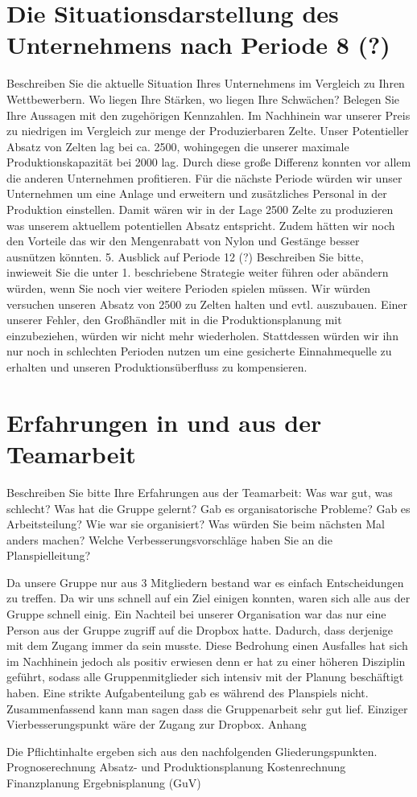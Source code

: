 \documentclass[12pt]{article}
\begin{document}
\section{Die Situationsdarstellung des Unternehmens nach Periode 8 (?)}  
Beschreiben Sie die aktuelle Situation Ihres Unternehmens im Vergleich zu Ihren Wettbewerbern. Wo liegen Ihre Stärken, wo liegen Ihre Schwächen? Belegen Sie Ihre Aussagen mit den zugehörigen Kennzahlen.
Im Nachhinein war unserer Preis zu niedrigen im Vergleich zur menge der Produzierbaren Zelte.
Unser Potentieller Absatz von Zelten lag bei ca. 2500, wohingegen die unserer maximale Produktionskapazität bei 2000 lag.
Durch diese große Differenz konnten vor allem die anderen Unternehmen profitieren.
Für die nächste Periode würden wir unser Unternehmen um eine Anlage und erweitern und zusätzliches Personal in der Produktion einstellen.
Damit wären wir in der Lage 2500 Zelte zu produzieren was unserem aktuellem potentiellen Absatz entspricht.
Zudem hätten wir noch den Vorteile das wir den Mengenrabatt von Nylon und Gestänge besser ausnützen könnten.
5.	Ausblick auf Periode 12  (?)
Beschreiben Sie bitte, inwieweit Sie die unter 1. beschriebene Strategie weiter führen oder abändern würden, wenn Sie noch vier weitere Perioden spielen müssen.
Wir würden versuchen unseren Absatz von 2500 zu Zelten halten und evtl. auszubauen.
Einer unserer Fehler, den Großhändler mit in die Produktionsplanung mit einzubeziehen, würden wir nicht mehr wiederholen.
Stattdessen würden wir ihn nur noch in schlechten Perioden nutzen um eine gesicherte
Einnahmequelle zu erhalten und unseren Produktionsüberfluss zu kompensieren.


\section{Erfahrungen in und aus der Teamarbeit}
Beschreiben Sie bitte Ihre Erfahrungen aus der Teamarbeit:
Was war gut, was schlecht?
Was hat die Gruppe gelernt?
Gab es organisatorische Probleme?
Gab es Arbeitsteilung? Wie war sie organisiert?
Was würden Sie beim nächsten Mal anders machen?
Welche Verbesserungsvorschläge haben Sie an die Planspielleitung?



Da unsere Gruppe nur aus 3 Mitgliedern bestand war es einfach Entscheidungen zu treffen.
Da wir uns schnell auf ein Ziel einigen konnten, waren sich alle aus der Gruppe schnell einig.
Ein Nachteil bei unserer Organisation war das nur eine Person aus der Gruppe zugriff auf die Dropbox hatte.
Dadurch, dass derjenige mit dem Zugang immer da sein musste.
Diese Bedrohung einen Ausfalles hat sich im Nachhinein jedoch als positiv erwiesen denn er hat zu einer höheren Disziplin geführt, sodass alle Gruppenmitglieder sich intensiv mit der Planung beschäftigt haben.
Eine strikte Aufgabenteilung gab es während des Planspiels nicht.
Zusammenfassend kann man sagen dass die Gruppenarbeit sehr gut lief.
Einziger Vierbesserungspunkt wäre  der Zugang zur Dropbox. 
Anhang



Die Pflichtinhalte ergeben sich aus den nachfolgenden Gliederungspunkten.
Prognoserechnung
Absatz- und Produktionsplanung
Kostenrechnung
Finanzplanung
Ergebnisplanung (GuV)
\end{document}
